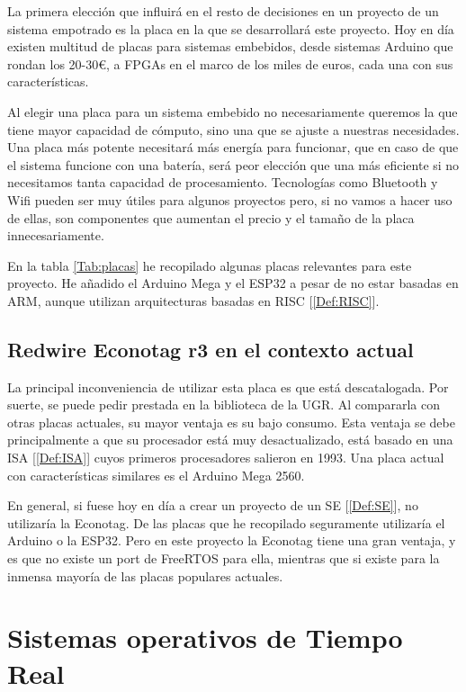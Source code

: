 La primera elección que influirá en el resto de decisiones en un proyecto de un sistema empotrado es la placa en la que se desarrollará este proyecto. Hoy en día existen multitud de placas para sistemas embebidos, desde sistemas Arduino que rondan los 20-30€, a FPGAs en el marco de los miles de euros, cada una con sus características.

Al elegir una placa para un sistema embebido no necesariamente queremos la que tiene mayor capacidad de cómputo, sino una que se ajuste a nuestras necesidades. Una placa más potente necesitará más energía para funcionar, que en caso de que el sistema funcione con una batería, será peor elección que una más eficiente si no necesitamos tanta capacidad de procesamiento. Tecnologías como Bluetooth y Wifi pueden ser muy útiles para algunos proyectos pero, si no vamos a hacer uso de ellas, son componentes que aumentan el precio y el tamaño de la placa innecesariamente.

En la tabla \ref{Tab:placas} he recopilado algunas placas relevantes para este proyecto. He añadido el Arduino Mega y el ESP32 a pesar de no estar basadas en ARM, aunque utilizan arquitecturas basadas en RISC [\ref{Def:RISC}].

\subsection{Redwire Econotag r3 en el contexto actual}
La principal inconveniencia de utilizar esta placa es que está descatalogada. Por suerte, se puede pedir prestada en la biblioteca de la UGR. Al compararla con otras placas actuales, su mayor ventaja es su bajo consumo. Esta ventaja se debe principalmente a que su procesador está muy desactualizado, está basado en una ISA [\ref{Def:ISA}] cuyos primeros procesadores salieron en 1993. Una placa actual con características similares es el Arduino Mega 2560.

En general, si fuese hoy en día a crear un proyecto de un SE [\ref{Def:SE}], no utilizaría la Econotag. De las placas que he recopilado seguramente utilizaría el Arduino o la ESP32. Pero en este proyecto la Econotag tiene una gran ventaja, y es que no existe un port de FreeRTOS para ella, mientras que si existe para la inmensa mayoría de las placas populares actuales.

\section{Sistemas operativos de Tiempo Real}

